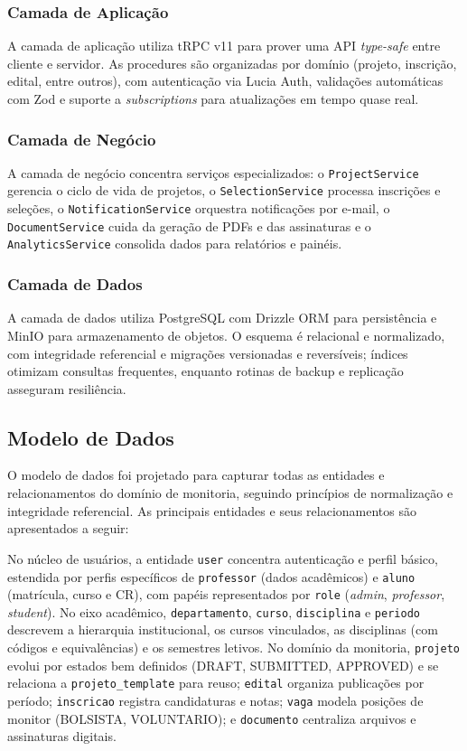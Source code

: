 \documentclass[portuguese]{sbc2025}%
\begin{document}
\subsubsection{Camada de Aplicação}

A camada de aplicação utiliza tRPC v11 para prover uma API \textit{type-safe} entre cliente e servidor. As procedures são organizadas por domínio (projeto, inscrição, edital, entre outros), com autenticação via Lucia Auth, validações automáticas com Zod e suporte a \textit{subscriptions} para atualizações em tempo quase real.

\subsubsection{Camada de Negócio}

A camada de negócio concentra serviços especializados: o \texttt{ProjectService} gerencia o ciclo de vida de projetos, o \texttt{SelectionService} processa inscrições e seleções, o \texttt{NotificationService} orquestra notificações por e-mail, o \texttt{DocumentService} cuida da geração de PDFs e das assinaturas e o \texttt{AnalyticsService} consolida dados para relatórios e painéis.

\subsubsection{Camada de Dados}

A camada de dados utiliza PostgreSQL com Drizzle ORM para persistência e MinIO para armazenamento de objetos. O esquema é relacional e normalizado, com integridade referencial e migrações versionadas e reversíveis; índices otimizam consultas frequentes, enquanto rotinas de backup e replicação asseguram resiliência.

\subsection{Modelo de Dados}

O modelo de dados foi projetado para capturar todas as entidades e relacionamentos do domínio de monitoria, seguindo princípios de normalização e integridade referencial. As principais entidades e seus relacionamentos são apresentados a seguir:

No núcleo de usuários, a entidade \texttt{user} concentra autenticação e perfil básico, estendida por perfis específicos de \texttt{professor} (dados acadêmicos) e \texttt{aluno} (matrícula, curso e CR), com papéis representados por \texttt{role} (\textit{admin}, \textit{professor}, \textit{student}). No eixo acadêmico, \texttt{departamento}, \texttt{curso}, \texttt{disciplina} e \texttt{periodo} descrevem a hierarquia institucional, os cursos vinculados, as disciplinas (com códigos e equivalências) e os semestres letivos. No domínio da monitoria, \texttt{projeto} evolui por estados bem definidos (DRAFT, SUBMITTED, APPROVED) e se relaciona a \texttt{projeto\_template} para reuso; \texttt{edital} organiza publicações por período; \texttt{inscricao} registra candidaturas e notas; \texttt{vaga} modela posições de monitor (BOLSISTA, VOLUNTARIO); e \texttt{documento} centraliza arquivos e assinaturas digitais.
\end{document}
